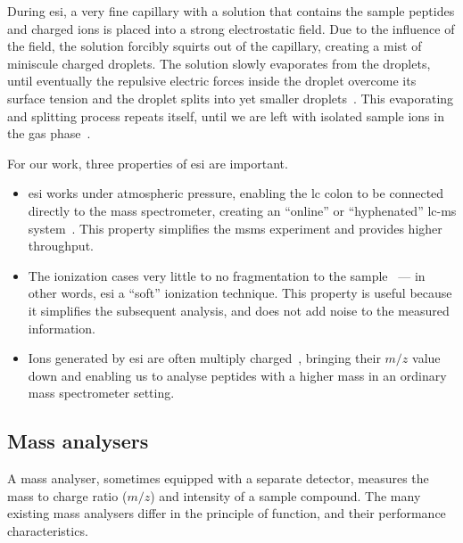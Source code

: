 During \gls*{esi}, a very fine capillary with a solution that contains the sample peptides and charged ions is placed into a strong electrostatic field. Due to the influence of the field, the solution forcibly squirts out of the capillary, creating a mist of miniscule charged droplets. The solution slowly evaporates from the droplets, until eventually the repulsive electric forces inside the droplet overcome its surface tension and the droplet splits into yet smaller droplets~\cite{rayleigh1882xx}. This evaporating and splitting process repeats itself, until we are left with isolated sample ions in the gas phase~\cite{dole1968molecular,dole1968gas,fenn1989electrospray, fenn1990electrospray}.

For our work, three properties of \gls*{esi} are important.

\begin{itemize}
  \item \gls*{esi} works under atmospheric pressure, enabling the \gls*{lc} colon to be connected directly to the mass spectrometer, creating an ``online'' or ``hyphenated'' \gls*{lc}-\gls*{ms} system~\cite{opiteck1997comprehensive}. This property simplifies the \gls*{msms} experiment and provides higher throughput.
  \item The ionization cases very little to no fragmentation to the sample~\cite{griffiths2001electrospray} --- in other words, \gls*{esi} a ``soft'' ionization technique. This property is useful because it simplifies the subsequent analysis, and does not add noise to the measured information.
  \item  Ions generated by \gls*{esi} are often multiply charged~\cite{felitsyn2002origin}, bringing their \(m/z\) value down and enabling us to analyse peptides with a higher mass in an ordinary mass spectrometer setting.
\end{itemize}

\subsection{Mass analysers}\label{sec:msms-analysis}

A mass analyser, sometimes equipped with a separate detector, measures the mass to charge ratio (\(m/z\)) and intensity of a sample compound. The many existing mass analysers differ in the principle of function, and their performance characteristics.

